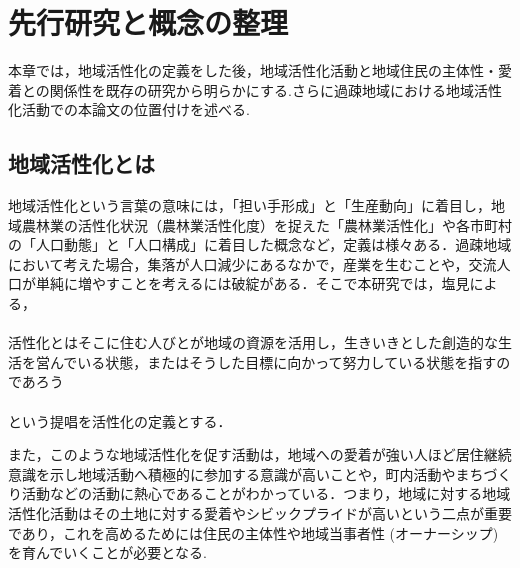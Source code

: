\documentclass[a4paper]{jsarticle}
\begin{document}
\newpage

\section{先行研究と概念の整理}
本章では，地域活性化の定義をした後，地域活性化活動と地域住民の主体性・愛着との関係性を既存の研究から明らかにする.さらに過疎地域における地域活性化活動での本論文の位置付けを述べる.
\subsection{地域活性化とは}
地域活性化という言葉の意味には，「担い手形成」と「生産動向」に着目し，地域農林業の活性化状況（農林業活性化度）を捉えた「農林業活性化」や各市町村の「人口動態」と「人口構成」に着目した概念など，定義は様々ある．過疎地域において考えた場合，集落が人口減少にあるなかで，産業を生むことや，交流人口が単純に増やすことを考えるには破綻がある．そこで本研究では，塩見による，\\\\
活性化とはそこに住む人びとが地域の資源を活用し，生きいきとした創造的な生活を営んでいる状態，またはそうした目標に向かって努力している状態を指すのであろう\cite{shiomi}\\\\
という提唱を活性化の定義とする．\par
また，このような地域活性化を促す活動は，地域への愛着が強い人ほど居住継続意識を示し地域活動へ積極的に参加する意識が高いことや，町内活動やまちづくり活動などの活動に熱心であること\cite{8}がわかっている．つまり，地域に対する地域活性化活動はその土地に対する愛着やシビックプライドが高いという二点が重要であり，これを高めるためには住民の主体性や地域当事者性 (オーナーシップ) を育んでいくことが必要となる.\par
\end{document}
